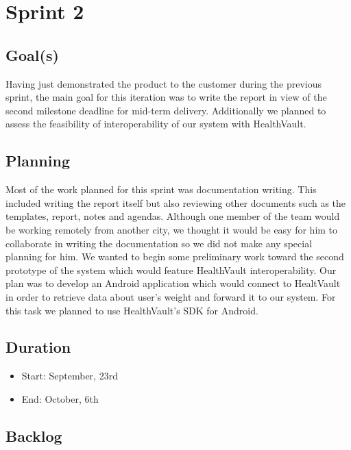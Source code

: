 

\chapter{Sprint 2}
\label{Sprint0}

\section{Goal(s)}
Having just demonstrated the product to the customer during the previous sprint, the main goal
for this iteration was to write the report in view of the second milestone deadline for mid-term delivery.
Additionally we planned to assess the feasibility of interoperability of our system with HealthVault.

\section{Planning}

Most of the work planned for this sprint was documentation writing.
This included writing the report itself but also reviewing other documents such as the
templates, report, notes and agendas. Although one member of the team would be working remotely
from another city, we thought it would be easy for him to collaborate in writing the documentation
so we did not make any special planning for him.
We wanted to begin some preliminary work toward the second prototype of the system which would
feature HealthVault interoperability. Our plan was to develop an Android application which would connect
to HealtVault in order to retrieve data about user's weight and forward it to our system. For this task
we planned to use HealthVault's SDK for Android.

\section{Duration}
\begin{itemize}
\item Start: September, 23rd
\item End: October, 6th
\end{itemize}

\section{Backlog}

